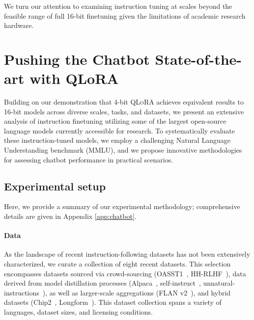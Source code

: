 We turn our attention to examining instruction tuning at scales beyond the feasible range of full 16-bit finetuning given the limitations of academic research hardware.

\section{Pushing the Chatbot State-of-the-art with QLoRA}
\label{sec:pushing}
Building on our demonstration that 4-bit \textsc{QLoRA} achieves equivalent results to 16-bit models across diverse scales, tasks, and datasets, we present an extensive analysis of instruction finetuning utilizing some of the largest open-source language models currently accessible for research. To systematically evaluate these instruction-tuned models, we employ a challenging Natural Language Understanding benchmark (MMLU), and we propose innovative methodologies for assessing chatbot performance in practical scenarios.

\subsection{Experimental setup} Here, we provide a summary of our experimental methodology; comprehensive details are given in Appendix \ref{app:chatbot}.

\paragraph{Data} As the landscape of recent instruction-following datasets has not been extensively characterized, we curate a collection of eight recent datasets. This selection encompasses datasets sourced via crowd-sourcing (OASST1~\citep{kopf2023openassistant}, HH-RLHF~\citep{bai2022training}), data derived from model distillation processes (Alpaca~\citep{alpaca}, self-instruct~\citep{wang2022self}, unnatural-instructions~\citep{honovich2022unnatural}), as well as larger-scale aggregations (FLAN v2~\citep{chung2022scaling}), and hybrid datasets (Chip2~\citep{laion2023}, Longform~\citep{koksal2023longform}). This dataset collection spans a variety of languages, dataset sizes, and licensing conditions.

